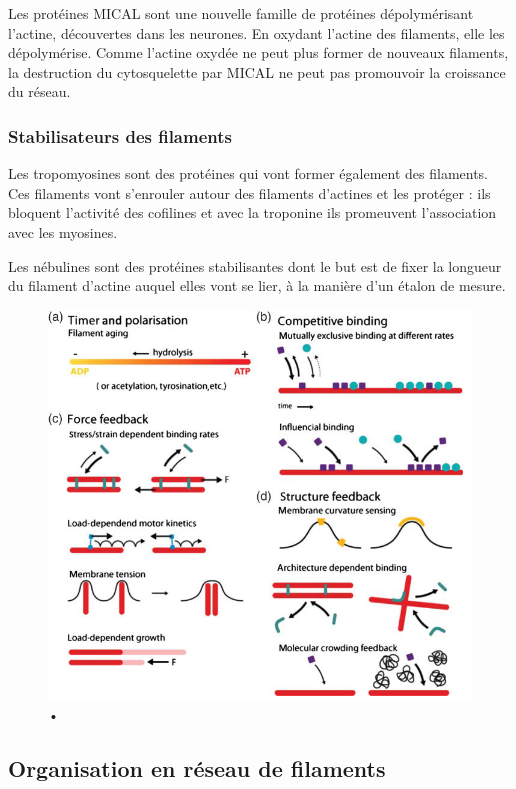 Les protéines MICAL sont une nouvelle famille de protéines dépolymérisant l'actine, découvertes dans les neurones. En oxydant l'actine des filaments, elle les dépolymérise. Comme l'actine oxydée ne peut plus former de nouveaux filaments, la destruction du cytosquelette par MICAL ne peut pas promouvoir la croissance du réseau. 

\subsubsection{Stabilisateurs des filaments}

Les tropomyosines sont des protéines qui vont former également des filaments. Ces filaments vont s'enrouler autour des filaments d'actines et les protéger : ils bloquent l'activité des cofilines et avec la troponine ils promeuvent l'association avec les myosines. 

Les nébulines sont des protéines stabilisantes dont le but est de fixer la longueur du filament d'actine auquel elles vont se lier, à la manière d'un étalon de mesure. 

\begin{figure}[h!]
\includegraphics[scale=0.7]{Actine_phenomenon.png}
\caption{•}
\end{figure}

\subsection{Organisation en réseau de filaments}

